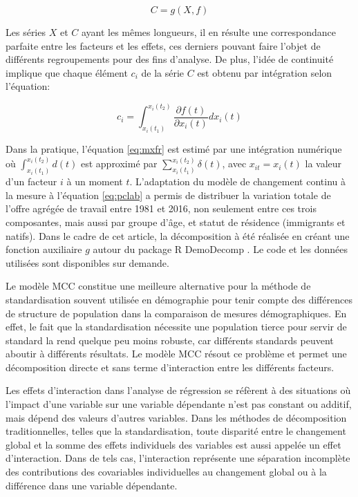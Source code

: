 \begin{equation}\label{eq:gfr}
  C=g(X,f)
\end{equation}

Les séries \(X \) et \(C \) ayant les mêmes longueurs, il en résulte une correspondance parfaite entre les facteurs et les effets, ces derniers pouvant faire l'objet de différents regroupements pour des fins d'analyse.
De plus, l'idée de continuité implique que chaque élément \(c_i \) de la série \(C \) est obtenu par intégration selon l'équation:

\begin{equation}\label{eq:mxfr}
  c_i=\int_{x_i(t_1)}^{x_i(t_2)} \frac{\partial f(t)}{\partial x_i(t)} dx_i(t)
\end{equation}

Dans la pratique, l'équation \eqref{eq:mxfr} est estimé par une intégration numérique où \( \int_{x_i(t_1)}^{x_i(t_2)} d(t)\) est approximé par \( \sum_{x_i(t_1)}^{x_i(t_2)} \delta(t)\), avec \(x_{it} = x_i(t) \) la valeur d'un facteur \(i \) à un moment \(t \).
L’adaptation du modèle de changement continu à la mesure à l’équation \eqref{eq:pclab} a permis de distribuer la variation totale de l’offre agrégée de travail entre 1981 et 2016, non seulement entre ces trois composantes, mais aussi par groupe d'âge, et statut de résidence (immigrants et natifs). Dans le cadre de cet article, la décomposition à été réalisée en créant une fonction auxiliaire \(g\) autour du package R \citep{Rstat:2018} DemoDecomp \citep{DemoDecomp:2018}. Le code et les données utilisées sont disponibles sur demande.

\vspace{0.7em}\par
Le modèle MCC constitue une meilleure alternative pour la méthode de standardisation souvent utilisée en démographie pour tenir compte des différences de structure de population dans la comparaison de mesures démographiques.
En effet, le fait que la standardisation nécessite une population tierce pour servir de standard la rend quelque peu moins robuste, car différents standards peuvent aboutir à différents résultats.
Le modèle MCC résout ce problème et permet une décomposition directe et sans terme d'interaction entre les différents facteurs.

Les effets d'interaction dans l'analyse de régression se réfèrent à des situations où l'impact d'une variable sur une variable dépendante n'est pas constant ou additif, mais dépend des valeurs d'autres variables. Dans les méthodes de décomposition traditionnelles, telles que la standardisation, toute disparité entre le changement global et la somme des effets individuels des variables est aussi appelée un effet d'interaction. Dans de tels cas, l'interaction représente une séparation incomplète des contributions des covariables individuelles au changement global ou à la différence dans une variable dépendante.

